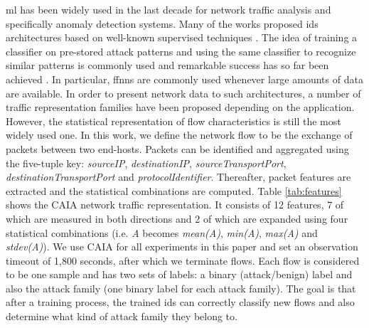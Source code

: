 \documentclass[conference]{IEEEtran}
\begin{document}
\gls{ml} has been widely used in the last decade for network traffic analysis and specifically anomaly detection systems. Many of the works proposed \gls{ids} architectures based on well-known supervised techniques \cite{survey}. The idea of training a classifier on pre-stored attack patterns and using the same classifier to recognize similar patterns is commonly used and remarkable success has so far been achieved \cite{survey}. In particular, \glspl{ffnn} are commonly used whenever large amounts of data are available. In order to present network data to such architectures, a number of traffic representation families have been proposed depending on the application. However, the statistical representation of flow characteristics is still the most widely used one. In this work, we define the network flow to be the exchange of packets between two end-hosts. Packets can be identified and aggregated using the five-tuple key: \emph{sourceIP}, \emph{destinationIP}, \emph{sourceTransportPort}, \emph{destinationTransportPort} and \emph{protocolIdentifier}. Thereafter, packet features are extracted and the statistical combinations are computed. Table \ref{tab:features} shows the CAIA \cite{williams_preliminary_2006} network traffic representation. It consists of 12 features, 7 of which are measured in both directions and 2 of which are expanded using four statistical combinations (i.e. \emph{A} becomes \emph{mean(A)}, \emph{min(A)}, \emph{max(A)} and \emph{stdev(A)}). We use CAIA for all experiments in this paper and set an observation timeout of 1,800 seconds, after which we terminate flows. Each flow is considered to be one sample and has two sets of labels: a binary (attack/benign) label and also the attack family (one binary label for each attack family). The goal is that after a training process, the trained \gls{ids} can correctly classify new flows and also determine what kind of attack family they belong to.
\end{document}
